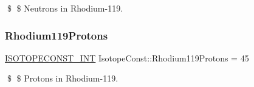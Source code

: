\$ \$ Neutrons in Rhodium-\/119. \mbox{\label{group___isotope_const-_rhodium-_rh119_gae0f151efd21be45cc30f5823528565d2}} 
\subsubsection{\texorpdfstring{Rhodium119\+Protons}{Rhodium119Protons}}
{\footnotesize\ttfamily \mbox{\hyperlink{group___isotope_const-_macros_ga5f18360b3e99483a35c32d789e62621c}{I\+S\+O\+T\+O\+P\+E\+C\+O\+N\+S\+T\+\_\+\+I\+NT}} Isotope\+Const\+::\+Rhodium119\+Protons = 45}

\$ \$ Protons in Rhodium-\/119. 